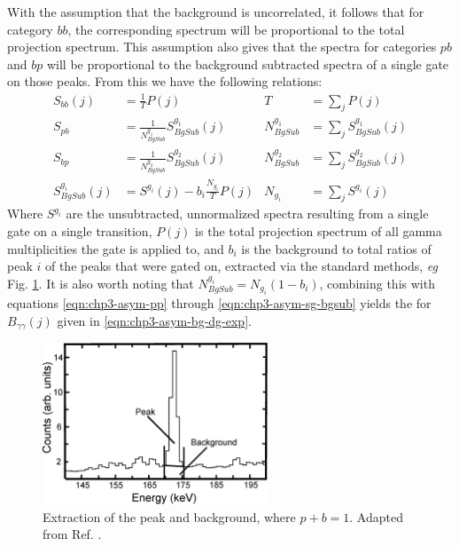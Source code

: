 With the assumption that the background is uncorrelated, it follows that for category $bb$, the corresponding spectrum will be proportional to the total projection spectrum. This assumption also gives that the spectra for categories $pb$ and $bp$ will be proportional to the background subtracted spectra of a single gate on those peaks. From this we have the following relations:
\begin{align}
S_{bb}(j) &=\frac{1}{T}P(j) & T &= \sum\limits_{j}^{}P(j) \label{eqn:chp3-asym-bb}\\
S_{pb} &= \frac{1}{N^{g_1}_{BgSub}}S^{g_1}_{BgSub}(j)  & N^{g_1}_{BgSub} &= \sum\limits_{j}^{}S^{g_1}_{BgSub}(j) \label{eqn:chp3-asym-bp}\\
S_{bp} &= \frac{1}{N^{g_2}_{BgSub}}S^{g_2}_{BgSub}(j)  & N^{g_2}_{BgSub} &= \sum\limits_{j}^{}S^{g_2}_{BgSub}(j) \label{eqn:chp3-asym-pb}\\
S^{g_i}_{BgSub}(j) &= S^{g_i}(j) - b_i \frac{N_{g_i}}{T}P(j) & N_{g_i} &=  \sum\limits_{j}^{}S^{g_i}(j)  \label{eqn:chp3-asym-sg-bgsub}
\end{align}
Where $S^{g_i}$ are the unsubtracted, unnormalized spectra resulting from a single gate on a single transition, $P(j)$ is the total projection spectrum of all gamma multiplicities the gate is applied to, and $b_i$ is the background to total ratios of peak $i$ of the peaks that were gated on, extracted via the standard methods, \emph{eg} Fig. \ref{fig:chp3-asym-bg-ratio}. It is also worth noting that $N^{g_i}_{BgSub} = N_{g_i}(1 - b_i)$, combining this with equations \ref{eqn:chp3-asym-pp} through \ref{eqn:chp3-asym-sg-bgsub} yields the for $B_{\gamma{}\gamma{}}(j)$ given in \ref{eqn:chp3-asym-bg-dg-exp}.

\begin{figure}[h!]
	\centerline{\includegraphics[width=0.6\textwidth]{./img/c3/peak_to_bg_asym_bg.eps}}
	\caption{Extraction of the peak and background, where $p + b = 1$. Adapted from Ref. \cite{asymBGSub}.}
	\label{fig:chp3-asym-bg-ratio}
\end{figure}

